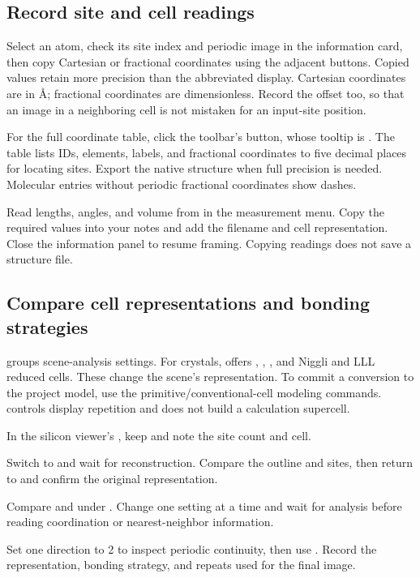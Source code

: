 \subsection{Record site and cell readings}

Select an atom, check its site index and periodic image in the information card, then copy Cartesian or fractional coordinates using the adjacent buttons. Copied values retain more precision than the abbreviated display. Cartesian coordinates are in \AA; fractional coordinates are dimensionless. Record the  offset too, so that an image in a neighboring cell is not mistaken for an input-site position.

For the full coordinate table, click the toolbar's  button, whose tooltip is . The table lists IDs, elements, labels, and fractional coordinates to five decimal places for locating sites. Export the native structure when full precision is needed. Molecular entries without periodic fractional coordinates show dashes.

Read lengths, angles, and volume from  in the measurement menu. Copy the required values into your notes and add the filename and cell representation. Close the information panel to resume framing. Copying readings does not save a structure file.

\subsection{Compare cell representations and bonding strategies}

 groups scene-analysis settings. For crystals,  offers , , , and Niggli and LLL reduced cells. These change the scene's representation. To commit a conversion to the project model, use the primitive/conventional-cell modeling commands.  controls display repetition and does not build a calculation supercell.

\begin{steps}
\item In the silicon viewer's , keep  and note the site count and cell.
\item Switch  to  and wait for reconstruction. Compare the outline and sites, then return to  and confirm the original representation.
\item Compare  and  under . Change one setting at a time and wait for analysis before reading coordination or nearest-neighbor information.
\item Set one  direction to 2 to inspect periodic continuity, then use . Record the representation, bonding strategy, and repeats used for the final image.
\end{steps}

